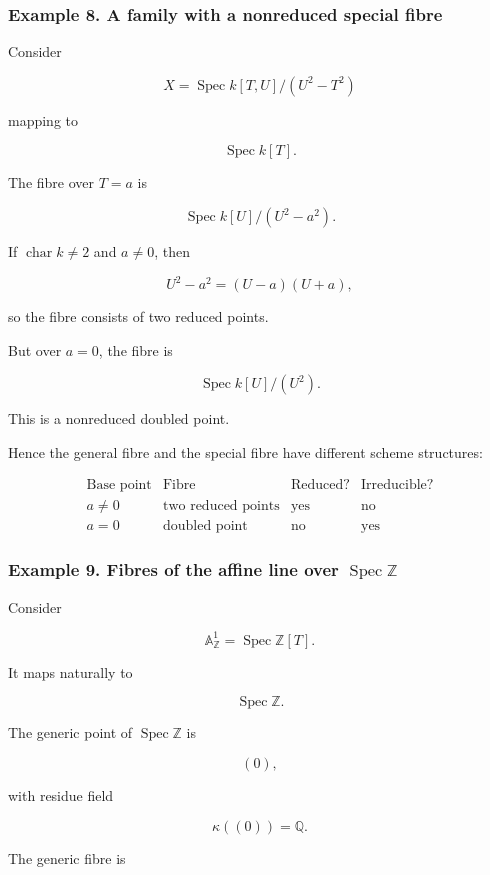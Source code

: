 \documentclass[12pt,a4paper]{article}
\theoremstyle{notespace}
\begin{document}
\subsubsection{Example 8. A family with a nonreduced special fibre}

Consider

\[
X=\operatorname{Spec}k[T,U]/(U^2-T^2)
\]

mapping to

\[
\operatorname{Spec}k[T].
\]

The fibre over \(T=a\) is

\[
\operatorname{Spec}k[U]/(U^2-a^2).
\]

If \(\operatorname{char}k\neq 2\) and \(a\neq 0\), then

\[
U^2-a^2=(U-a)(U+a),
\]

so the fibre consists of two reduced points.

But over \(a=0\), the fibre is

\[
\operatorname{Spec}k[U]/(U^2).
\]

This is a nonreduced doubled point.

Hence the general fibre and the special fibre have different scheme structures:

\[
\begin{array}{c|c|c|c}
	\text{Base point} & \text{Fibre} & \text{Reduced?} & \text{Irreducible?} \\
	\hline
	a\neq 0 & \text{two reduced points} & \text{yes} & \text{no} \\
	a=0 & \text{doubled point} & \text{no} & \text{yes}
\end{array}
\]

\subsubsection{Example 9. Fibres of the affine line over \(\operatorname{Spec}\mathbb{Z}\)}

Consider

\[
\mathbb{A}^1_{\mathbb{Z}}
=
\operatorname{Spec}\mathbb{Z}[T].
\]

It maps naturally to

\[
\operatorname{Spec}\mathbb{Z}.
\]

The generic point of \(\operatorname{Spec}\mathbb{Z}\) is

\[
(0),
\]

with residue field

\[
\kappa((0))=\mathbb{Q}.
\]

The generic fibre is
\end{document}
